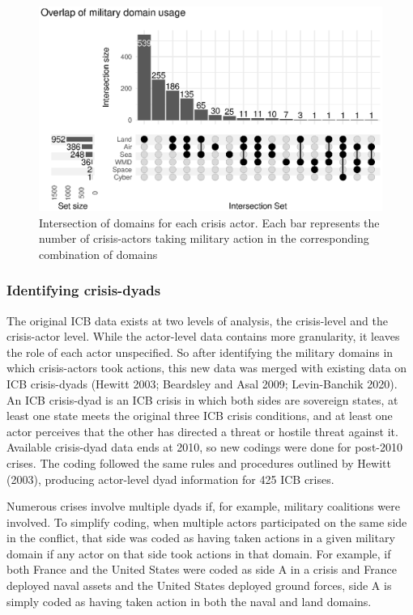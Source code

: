 \documentclass[
]{article}
\begin{document}
\begin{figure}[h!]

{\centering \includegraphics{2022-05-03_ICB-Domains_files/figure-latex/fig-1-1} 

}

\caption{Intersection of domains for each crisis actor. Each bar represents the number of crisis-actors taking military action in the corresponding combination of domains}\label{fig:fig-1}
\end{figure}

\hypertarget{identifying-crisis-dyads}{%
\subsubsection{Identifying crisis-dyads}\label{identifying-crisis-dyads}}

The original ICB data exists at two levels of analysis, the crisis-level and the crisis-actor level. While the actor-level data contains more granularity, it leaves the role of each actor unspecified. So after identifying the military domains in which crisis-actors took actions, this new data was merged with existing data on ICB crisis-dyads (Hewitt 2003; Beardsley and Asal 2009; Levin-Banchik 2020). An ICB crisis-dyad is an ICB crisis in which both sides are sovereign states, at least one state meets the original three ICB crisis conditions, and at least one actor perceives that the other has directed a threat or hostile threat against it. Available crisis-dyad data ends at 2010, so new codings were done for post-2010 crises. The coding followed the same rules and procedures outlined by Hewitt (2003), producing actor-level dyad information for 425 ICB crises.

Numerous crises involve multiple dyads if, for example, military coalitions were involved. To simplify coding, when multiple actors participated on the same side in the conflict, that side was coded as having taken actions in a given military domain if any actor on that side took actions in that domain. For example, if both France and the United States were coded as side A in a crisis and France deployed naval assets and the United States deployed ground forces, side A is simply coded as having taken action in both the naval and land domains.
\end{document}
